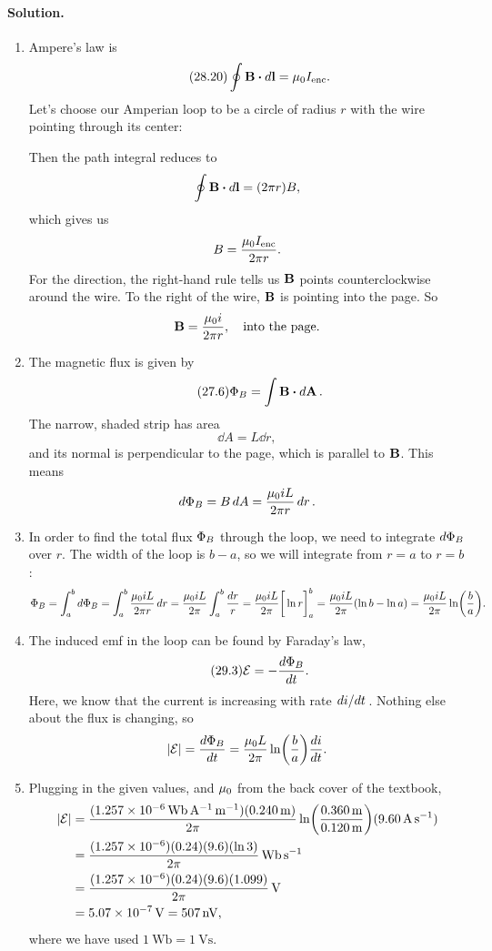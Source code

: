 \documentclass[11pt]{article}
\newcommand{\beq}{\begin{equation*}}
\newcommand{\eeq}{\end{equation*}}
\newcommand{\beqn}{\begin{equation}}
\newcommand{\eeqn}{\end{equation}}
\newenvironment{solution}
{
    \paragraph{Solution.}
    \ignorespaces
}
{
    \bigskip
}
\begin{document}
\begin{solution}
	\begin{enumerate}
		\item Ampere's law is
			\beqn \tag{28.20}
				\oint \vB \vdot \dd{\vl} = \muo \Ienc.
			\eeqn
			Let's choose our Amperian loop to be a circle of radius $r$ with the wire pointing through its center:
			
			\vspace{2in}
			
			Then the path integral reduces to
			\beq
				\oint \vB \vdot \dd{\vl} = (2\pi r) B,
			\eeq
			which gives us
			\beq
				B = \frac{\muo \Ienc}{2\pi r}.
			\eeq
			For the direction, the right-hand rule tells us $\vb{B}$ points counterclockwise around the wire.  To the right of the wire, $\vb{B}$ is pointing into the page.  So
			\beq
				\vB = \frac{\muo i}{2\pi r}, \quad \text{into the page.}
			\eeq
			
		\item The magnetic flux is given by
			\beqn \tag{27.6}
				\PhiB = \int \vB \vdot \dd{\vA}.
			\eeqn
			The narrow, shaded strip has area
			\beq
				\dd{A} = L \dd{r},
			\eeq
			and its normal is perpendicular to the page, which is parallel to $\vb{B}$.  This means
			\beq
				\dd{\PhiB} = B \dd{A} = \frac{\muo i L}{2\pi r} \dd{r}.
			\eeq
			
		\item In order to find the total flux $\Phi_B$ through the loop, we need to integrate $\dd{\Phi_B}$ over $r$.  The width of the loop is $b - a$, so we will integrate from $r = a$ to $r = b$:
			\beq
				\PhiB = \intab \dd{\PhiB}
				= \intab \frac{\muo i L}{2\pi r} \dd{r}
				= \frac{\muo i L}{2\pi} \intab \frac{\dd{r}}{r}
				= \frac{\muo i L}{2\pi} \bigg[ \ln r \bigg]_a^b
				= \frac{\muo i L}{2\pi} (\ln b - \ln a)
				= \frac{\muo i L}{2\pi} \ln(\frac{b}{a}).
			\eeq
			
		\item The induced emf in the loop can be found by Faraday's law,
			\beq \tag{29.3}
				\cE = -\dv{\PhiB}{t}.
			\eeq
			Here, we know that the current is increasing with rate $\dv*{i}{t}$.  Nothing else about the flux is changing, so
			\beq
				\abs{\cE} = \dv{\PhiB}{t} = \frac{\muo L}{2\pi} \ln(\frac{b}{a}) \dv{i}{t}.
			\eeq
			
		\item Plugging in the given values, and $\mu_0$ from the back cover of the textbook,
			\begin{align*}
				\abs{\cE} &= \frac{(\SI{1.257e-6}{\weber\per\ampere\per\meter}) (\SI{0.240}{\meter})}{2\pi} \ln(\frac{\SI{0.360}{\meter}}{\SI{0.120}{\meter}}) (\SI{9.60}{\ampere\per\second}) \\
				&= \frac{(\num{1.257e-6}) (0.24) (9.6) (\ln 3)}{2 \pi} \,\si{\weber\per\second} \\
				&= \frac{(\num{1.257e-6}) (0.24) (9.6) (1.099)}{2 \pi} \,\si{\volt} \\
				&= \SI{5.07e-7}{\volt}
				= \SI{507}{\nano\volt},
			\end{align*}
			where we have used $\SI{1}{\weber} = \SI{1}{\volt\second}$.
			

\end{enumerate}
\end{solution}
\end{document}
